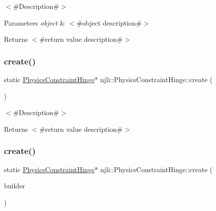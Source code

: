 $<$\#\+Description\#$>$


\begin{DoxyParams}{Parameters}
{\em object} & $<$\#object description\#$>$\\
\hline
\end{DoxyParams}
\begin{DoxyReturn}{Returns}
$<$\#return value description\#$>$ 
\end{DoxyReturn}
\mbox{\label{classnjli_1_1_physics_constraint_hinge_a143ffa4a346d08ecba967b4e0bd8b43c}} 
\subsubsection{\texorpdfstring{create()}{create()}\hspace{0.1cm}{\footnotesize\ttfamily [1/2]}}
{\footnotesize\ttfamily static \mbox{\hyperlink{classnjli_1_1_physics_constraint_hinge}{Physics\+Constraint\+Hinge}}$\ast$ njli\+::\+Physics\+Constraint\+Hinge\+::create (\begin{DoxyParamCaption}{ }\end{DoxyParamCaption})\hspace{0.3cm}{\ttfamily [static]}}

$<$\#\+Description\#$>$

\begin{DoxyReturn}{Returns}
$<$\#return value description\#$>$ 
\end{DoxyReturn}
\mbox{\label{classnjli_1_1_physics_constraint_hinge_ab30405bdc3c9a7bd84915ada5c07fd27}} 
\subsubsection{\texorpdfstring{create()}{create()}\hspace{0.1cm}{\footnotesize\ttfamily [2/2]}}
{\footnotesize\ttfamily static \mbox{\hyperlink{classnjli_1_1_physics_constraint_hinge}{Physics\+Constraint\+Hinge}}$\ast$ njli\+::\+Physics\+Constraint\+Hinge\+::create (\begin{DoxyParamCaption}\item[{const \mbox{\hyperlink{classnjli_1_1_physics_constraint_hinge_builder}{Physics\+Constraint\+Hinge\+Builder}} \&}]{builder }\end{DoxyParamCaption})\hspace{0.3cm}{\ttfamily [static]}}

